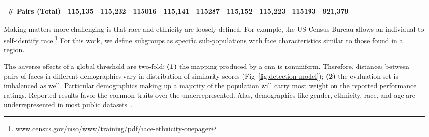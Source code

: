 \begin{table}[!t]
{{\begin{tabular}{r c c c c c c c c l}
        \# Pairs (Total) & 115,135 & 115,232    &115016 &115,141 & 115287  & 115,152  &  115,223& 115193 & 921,379\\ %
        
        \bottomrule
    \end{tabular}}
    }
\end{table}

    
    Making matters more challenging is that race and ethnicity are loosely defined. For example, the US Census Bureau allows an individual to self-identify race.\footnote{\scriptsize\href{https://www.census.gov/mso/www/training/pdf/race-ethnicity-onepager.pdf}{www.census.gov/mso/www/training/pdf/race-ethnicity-onepager}} For this work, we define subgroups as specific sub-populations with face characteristics similar to those found in a region. 
    
    
    The adverse effects of a global threshold are two-fold: \textbf{(1)} the mapping produced by a \gls{cnn} is nonuniform. Therefore, distances between pairs of faces in different demographics vary in distribution of similarity scores (Fig~\ref{fig:detection-model}); \textbf{(2)} the evaluation set is imbalanced as well. Particular demographics making up a majority of the population will carry most weight on the reported performance ratings. Reported results favor the common traits over the underrepresented. Alas, demographics like gender, ethnicity, race, and age are underrepresented in most public datasets~\cite{merler2019diversity, wang2018racial}. 
    
    
